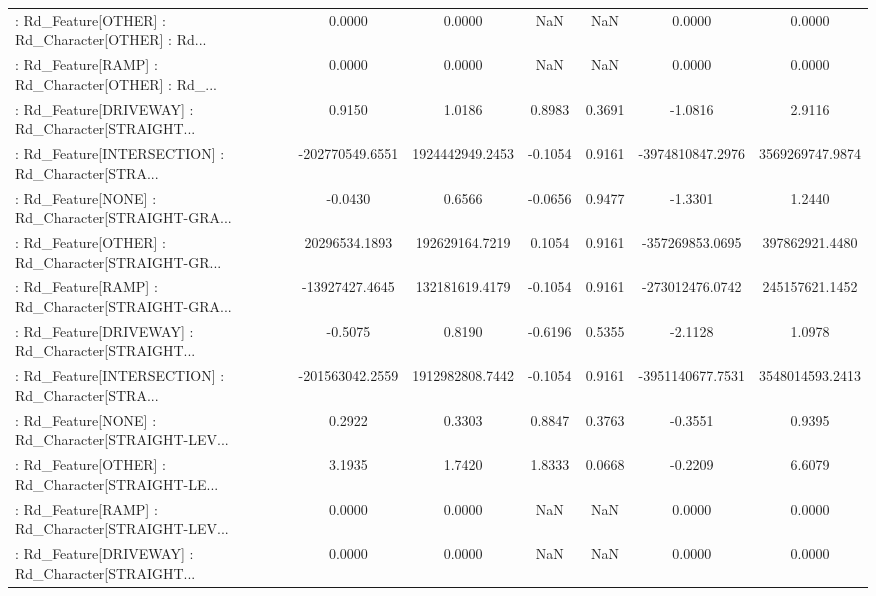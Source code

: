 \begin{longtable}{p{4cm}cccccc}
 : Rd\_Feature[OTHER] : Rd\_Character[OTHER] : Rd... &            0.0000 &            0.0000 &     NaN &          NaN &             0.0000 &            0.0000 \\
 : Rd\_Feature[RAMP] : Rd\_Character[OTHER] : Rd\_... &            0.0000 &            0.0000 &     NaN &          NaN &             0.0000 &            0.0000 \\
 : Rd\_Feature[DRIVEWAY] : Rd\_Character[STRAIGHT... &            0.9150 &            1.0186 &  0.8983 &       0.3691 &            -1.0816 &            2.9116 \\
 : Rd\_Feature[INTERSECTION] : Rd\_Character[STRA... &   -202770549.6551 &   1924442949.2453 & -0.1054 &       0.9161 &   -3974810847.2976 &   3569269747.9874 \\
 : Rd\_Feature[NONE] : Rd\_Character[STRAIGHT-GRA... &           -0.0430 &            0.6566 & -0.0656 &       0.9477 &            -1.3301 &            1.2440 \\
 : Rd\_Feature[OTHER] : Rd\_Character[STRAIGHT-GR... &     20296534.1893 &    192629164.7219 &  0.1054 &       0.9161 &    -357269853.0695 &    397862921.4480 \\
 : Rd\_Feature[RAMP] : Rd\_Character[STRAIGHT-GRA... &    -13927427.4645 &    132181619.4179 & -0.1054 &       0.9161 &    -273012476.0742 &    245157621.1452 \\
 : Rd\_Feature[DRIVEWAY] : Rd\_Character[STRAIGHT... &           -0.5075 &            0.8190 & -0.6196 &       0.5355 &            -2.1128 &            1.0978 \\
 : Rd\_Feature[INTERSECTION] : Rd\_Character[STRA... &   -201563042.2559 &   1912982808.7442 & -0.1054 &       0.9161 &   -3951140677.7531 &   3548014593.2413 \\
 : Rd\_Feature[NONE] : Rd\_Character[STRAIGHT-LEV... &            0.2922 &            0.3303 &  0.8847 &       0.3763 &            -0.3551 &            0.9395 \\
 : Rd\_Feature[OTHER] : Rd\_Character[STRAIGHT-LE... &            3.1935 &            1.7420 &  1.8333 &       0.0668 &            -0.2209 &            6.6079 \\
 : Rd\_Feature[RAMP] : Rd\_Character[STRAIGHT-LEV... &            0.0000 &            0.0000 &     NaN &          NaN &             0.0000 &            0.0000 \\
 : Rd\_Feature[DRIVEWAY] : Rd\_Character[STRAIGHT... &            0.0000 &            0.0000 &     NaN &          NaN &             0.0000 &            0.0000 \\

\end{longtable}
